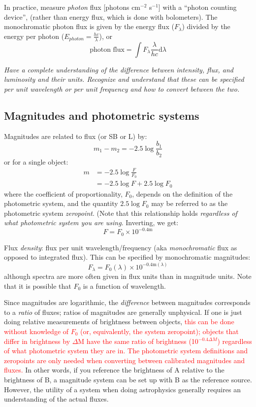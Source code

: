 \documentclass[12pt]{article}
\begin{document}
In practice, measure \emph{photon} flux [photons cm$^{-2}$ s$^{-1}$]
with a ``photon counting device'',
(rather than energy flux, which is done with bolometers).
The monochromatic photon flux is given by the
energy flux ($F_{\lambda}$) divided by the
energy per photon ($E_{photon} = \frac{hc}{\lambda}$), or
$$ \textrm{photon\ flux} = \int F_{\lambda}
    \frac{\lambda}{hc} \textrm{d} \lambda $$

\textcolor{om}{\emph{Have a complete understanding of the difference between
intensity, flux, and luminosity and their units. Recognize and
understand that these can be specified per unit wavelength or per unit
frequency and how to convert between the two.}}


\subsection{Magnitudes and photometric systems}
Magnitudes are related to flux (or SB or L) by:
    $$  m_1 - m_2 = -2.5 \log \frac{b_1}{b_2} $$
or for a single object:
\begin{align*}
    m &= -2.5 \log \frac{F}{F_0}\\
      &= -2.5 \log F + 2.5 \log F_0
\end{align*}
where the coefficient of proportionality, $F_0$, depends on the definition
of the photometric system, and the quantity $2.5\log{F_0}$ may be referred to as
the photometric system \emph{zeropoint}.
(Note that this relationship holds
\emph{regardless of what photometric system you are using}.
Inverting, we get:
    $$ F = F_{0} \times 10^{-0.4\textrm{m}} $$

Flux \emph{density}: flux per unit wavelength/frequency
(aka \emph{monochromatic} flux as opposed to integrated flux).
This can be specified by monochromatic magnitudes:
\begin{equation*}
    F_{\lambda} = F_0 (\lambda) \times 10^{-0.4 \textrm{m}(\lambda)}
\end{equation*}
although spectra are more often given in flux units than in magnitude units.
Note that it is possible that $F_0$ is a function of wavelength.

Since magnitudes are logarithmic, the \emph{difference} between
magnitudes corresponds to a \emph{ratio} of fluxes; ratios of magnitudes are
generally unphysical. If one is just doing relative measurements of
brightness between objects,
\textcolor{red}{this can be done without knowledge of $F_0$
(or, equivalently, the system zeropoint); objects that differ in brightness
by $\Delta$M have the same ratio of brightness (10$^{-0.4 \Delta M}$)
regardless of what photometric system they are in.
The photometric system definitions and zeropoints are only needed when
converting between calibrated magnitudes and fluxes.}
In other words, if you reference the
brightness of A relative to the brightness of B, a magnitude system
can be set up with B as the reference source.
However, the utility of a system when doing astrophysics generally
requires an understanding of the actual fluxes.
\end{document}
